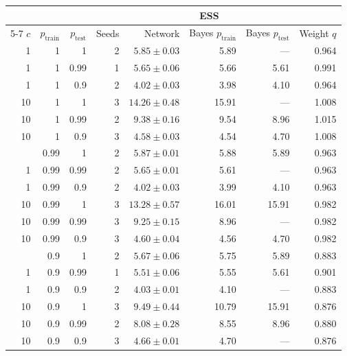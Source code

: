 \begingroup
\fontsize{9}{11}\selectfont
\setlength{\tabcolsep}{4.5pt}
\renewcommand{\arraystretch}{1.08}
\begin{tabular}{@{}rrrrrrrr@{}}
\toprule
& & & & \multicolumn{3}{c}{ESS} & \\
\cmidrule(lr){5-7}
$c$ & $p_{\mathrm{train}}$ & $p_{\mathrm{test}}$ & Seeds
& Network & Bayes $p_{\mathrm{train}}$ & Bayes $p_{\mathrm{test}}$ & Weight $q$ \\
\midrule
1  & 1 & 1    & 2 & $5.85\pm0.03$  & 5.89  & ---   & 0.964 \\
1  & 1 & 0.99 & 1 & $5.65\pm0.06$  & 5.66  & 5.61  & 0.991 \\
1  & 1 & 0.9  & 2 & $4.02\pm0.03$  & 3.98  & 4.10  & 0.964 \\
10 & 1 & 1    & 3 & $14.26\pm0.48$ & 15.91 & ---   & 1.008 \\
10 & 1 & 0.99 & 2 & $9.38\pm0.16$  & 9.54  & 8.96  & 1.015 \\
10 & 1 & 0.9  & 3 & $4.58\pm0.03$  & 4.54  & 4.70  & 1.008 \\
\addlinespace[4pt]
1  & 0.99 & 1    & 2 & $5.87\pm0.01$  & 5.88  & 5.89  & 0.963 \\
1  & 0.99 & 0.99 & 2 & $5.65\pm0.01$  & 5.61  & ---   & 0.963 \\
1  & 0.99 & 0.9  & 2 & $4.02\pm0.03$  & 3.99  & 4.10  & 0.963 \\
10 & 0.99 & 1    & 3 & $13.28\pm0.57$ & 16.01 & 15.91 & 0.982 \\
10 & 0.99 & 0.99 & 3 & $9.25\pm0.15$  & 8.96  & ---   & 0.982 \\
10 & 0.99 & 0.9  & 3 & $4.60\pm0.04$  & 4.56  & 4.70  & 0.982 \\
\addlinespace[4pt]
1  & 0.9 & 1    & 2 & $5.67\pm0.06$ & 5.75  & 5.89  & 0.883 \\
1  & 0.9 & 0.99 & 1 & $5.51\pm0.06$ & 5.55  & 5.61  & 0.901 \\
1  & 0.9 & 0.9  & 2 & $4.03\pm0.01$ & 4.10  & ---   & 0.883 \\
10 & 0.9 & 1    & 3 & $9.49\pm0.44$ & 10.79 & 15.91 & 0.876 \\
10 & 0.9 & 0.99 & 2 & $8.08\pm0.28$ & 8.55  & 8.96  & 0.880 \\
10 & 0.9 & 0.9  & 3 & $4.66\pm0.01$ & 4.70  & ---   & 0.876 \\
\bottomrule
\end{tabular}
\endgroup
